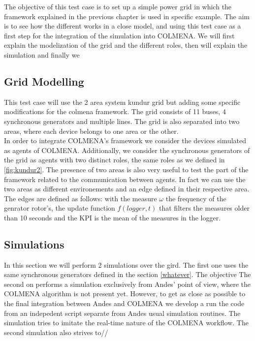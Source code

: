 The objective of this test case is to set up a simple power grid in which the framework explained in the previous chapter is used in specific example. The aim is to see how the different works in a close model, and using this test case as a first step for the integration of the simulation into COLMENA. We will first explain the modelization of the grid and the different roles, then will explain the simulation and finally we 

\subsection{Grid Modelling}

This test case will use the 2 area system kundur grid \cite{grids:kundur} but adding some specific modifications for the colmena framework. The grid consists of 11 buses, 4 synchronous generators and multiple lines. The grid is also separated into two areas, where each device belongs to one area or the other.  \\

In order to integrate COLMENA's framework we consider the devices simulated as agents of COLMENA. Additionally, we consider the synchronous generators of the grid as agents with two distinct roles, the same roles as we defined in \ref{fig:kundur2}. The presence of two areas is also very useful to test the part of the framework related to the communication between agents. In fact we can use the two areas as different environements and an edge defined in their respective area.  \\

The edges are defined as follows: with the measure $\omega$ the frequency of the genrator rotor's, the update function $f(logger, t)$ that filters the measures older than 10 seconds and the KPI is the mean of the measures in the logger.   

\subsection{Simulations}

In this section we will perform 2 simulations over the gird. The first one uses the same synchronous generators defined in the section \ref{whatever}. The objective 
The second on performs a simulation exclusively from Andes' point of view, where the COLMENA algorithm is not present yet. However, to get as close as possible to the final integration between Andes and COLMENA we develop a run the code from an indepedent script separate from Andes usual simulation routines. The simulation tries to imitate the real-time nature of the COLMENA workflow. The second simulation also strives to//

